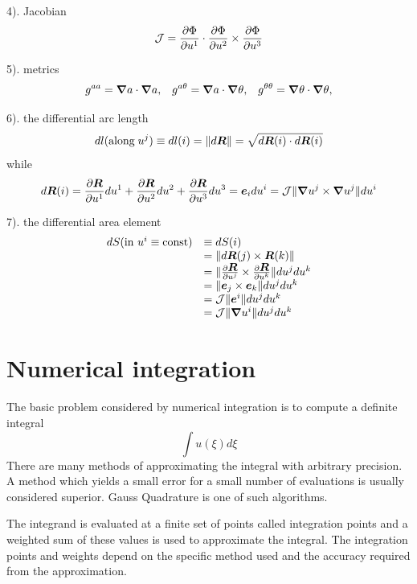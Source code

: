 \documentclass{report}
\newcommand{\bm}[1]{\mbox{\boldmath $#1$}}
\newcommand{\pp}[2]{\frac{\partial{#1}}{\partial{#2}}}
\begin{document}
\begin{appendices}
4). Jacobian
$$
{\cal J} = \pp{\Phi}{u^1} \cdot \pp{\Phi}{u^2} \times \pp{\Phi}{u^3}
$$

5). metrics
$$
g^{aa} = \bm{\nabla} a \cdot \bm{\nabla} a,
\;\;\;
g^{a\theta} = \bm{\nabla} a \cdot \bm{\nabla} \theta,
\;\;\;
g^{\theta\theta} = \bm{\nabla} \theta \cdot \bm{\nabla} \theta,
$$

6). the differential arc length
$$
dl(\mbox{along} \; u^j) 
\equiv dl(i)
= \| d\bm{R} \|
= \sqrt{ d\bm{R}(i) \cdot d\bm{R}(i)}
$$
while 
$$d\bm{R}(i) = \pp{\bm{R}}{u^1}du^1
               + \pp{\bm{R}}{u^2}du^2
               + \pp{\bm{R}}{u^3}du^3
             = \bm{e}_i du^i
             = {\cal J} \| \bm{\nabla}u^j \times \bm{\nabla}u^j \| du^i
$$

7). the differential area element
$$
\begin{array}{ll}
dS (\mbox{in } u^i
 \equiv \mbox{const})
& \equiv dS(i) \\
& = \| d\bm{R}(j) \times \bm{R}(k) \| \\
& = \| \pp{\bm{R}}{u^j} \times \pp{\bm{R}}{u^k} \| du^j du^k \\
& = \| \bm{e}_j \times \bm{e}_k \| du^j du^k \\
& = {\cal J} \| \bm{e}^i \| du^j du^k \\
& = {\cal J} \| \bm{\nabla} u^i \| du^j du^k
\end{array}
$$



\section{Numerical integration}
\label{App:gauss}
The basic problem considered by numerical integration is to compute a definite integral
\begin{equation}
\label{eq:int1}
\int u(\xi) d\xi
\end{equation}
There are many methods of approximating the integral with arbitrary precision.
A method 
which yields a small error for a small number of evaluations 
is usually considered superior. 
Gauss Quadrature is one of such algorithms.

The integrand is evaluated at a finite set of points called integration points 
and a weighted sum of these values is used to approximate the integral. 
The integration points and weights depend on the specific method used 
and the accuracy required from the approximation.


\end{appendices}
\end{document}
